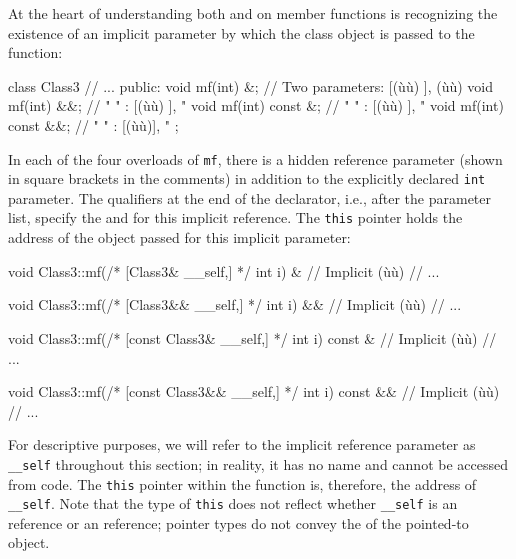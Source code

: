 At the heart of understanding both  and
 on member functions is recognizing the existence
of an implicit parameter by which the class object is passed to the
function:

\begin{emcppslisting}
class Class3
{
    // ...
public:
    void mf(int) &;         // Two parameters: [(ù{}ù)       ], (ù{}ù)
    void mf(int) &&;        //  "       "    : [(ù{}ù)      ],   "
    void mf(int) const &;   //  "       "    : [(ù{}ù) ],   "
    void mf(int) const &&;  //  "       "    : [(ù{}ù)],   "
};
\end{emcppslisting}
    

\noindent In each of the four overloads of \lstinline!mf!, there is a hidden
reference parameter (shown in square brackets in the comments) in
addition to the explicitly declared \lstinline!int! parameter. The
qualifiers at the end of the declarator, i.e., after the parameter list,
specify the  and  for this
implicit reference. The \lstinline!this! pointer holds the address of the
object passed for this implicit parameter:

\begin{emcppslisting}
void Class3::mf(/* [Class3& __self,] */ int i) &
{
    // Implicit (ù{}ù)
    // ...
}

void Class3::mf(/* [Class3&& __self,] */ int i) &&
{
    // Implicit (ù{}ù)
    // ...
}

void Class3::mf(/* [const Class3& __self,] */ int i) const &
{
    // Implicit (ù{}ù)
    // ...
}

void Class3::mf(/* [const Class3&& __self,] */ int i) const &&
{
    // Implicit (ù{}ù)
    // ...
}
\end{emcppslisting}
    

\noindent For descriptive purposes, we will refer to the implicit reference
parameter as \lstinline!__self! throughout this section; in reality, it
has no name and cannot be accessed from code. The \lstinline!this! pointer
within the function is, therefore, the address of \lstinline!__self!.
Note that the type of \lstinline!this! does not reflect whether
\lstinline!__self! is an  reference or an 
reference; pointer types do not convey the  of
the pointed-to object.

